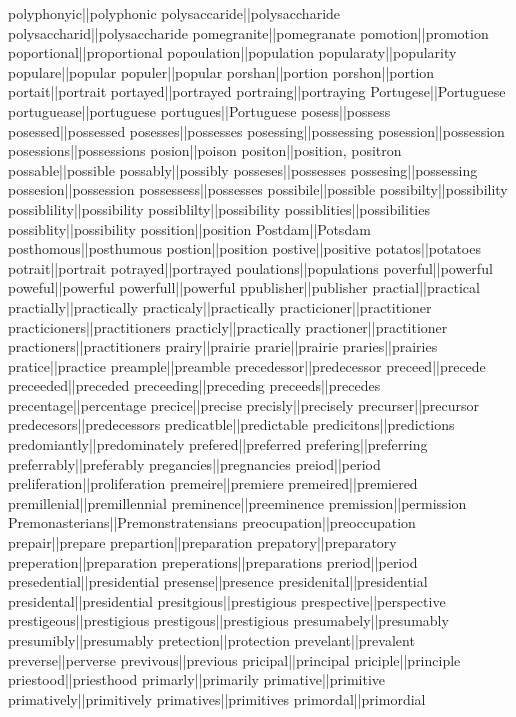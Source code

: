 polyphonyic||polyphonic
polysaccaride||polysaccharide
polysaccharid||polysaccharide
pomegranite||pomegranate
pomotion||promotion
poportional||proportional
popoulation||population
popularaty||popularity
populare||popular
populer||popular
porshan||portion
porshon||portion
portait||portrait
portayed||portrayed
portraing||portraying
Portugese||Portuguese
portuguease||portuguese
portugues||Portuguese
posess||possess
posessed||possessed
posesses||possesses
posessing||possessing
posession||possession
posessions||possessions
posion||poison
positon||position, positron
possable||possible
possably||possibly
posseses||possesses
possesing||possessing
possesion||possession
possessess||possesses
possibile||possible
possibilty||possibility
possiblility||possibility
possiblilty||possibility
possiblities||possibilities
possiblity||possibility
possition||position
Postdam||Potsdam
posthomous||posthumous
postion||position
postive||positive
potatos||potatoes
potrait||portrait
potrayed||portrayed
poulations||populations
poverful||powerful
poweful||powerful
powerfull||powerful
ppublisher||publisher
practial||practical
practially||practically
practicaly||practically
practicioner||practitioner
practicioners||practitioners
practicly||practically
practioner||practitioner
practioners||practitioners
prairy||prairie
prarie||prairie
praries||prairies
pratice||practice
preample||preamble
precedessor||predecessor
preceed||precede
preceeded||preceded
preceeding||preceding
preceeds||precedes
precentage||percentage
precice||precise
precisly||precisely
precurser||precursor
predecesors||predecessors
predicatble||predictable
predicitons||predictions
predomiantly||predominately
prefered||preferred
prefering||preferring
preferrably||preferably
pregancies||pregnancies
preiod||period
preliferation||proliferation
premeire||premiere
premeired||premiered
premillenial||premillennial
preminence||preeminence
premission||permission
Premonasterians||Premonstratensians
preocupation||preoccupation
prepair||prepare
prepartion||preparation
prepatory||preparatory
preperation||preparation
preperations||preparations
preriod||period
presedential||presidential
presense||presence
presidenital||presidential
presidental||presidential
presitgious||prestigious
prespective||perspective
prestigeous||prestigious
prestigous||prestigious
presumabely||presumably
presumibly||presumably
pretection||protection
prevelant||prevalent
preverse||perverse
previvous||previous
pricipal||principal
priciple||principle
priestood||priesthood
primarly||primarily
primative||primitive
primatively||primitively
primatives||primitives
primordal||primordial
